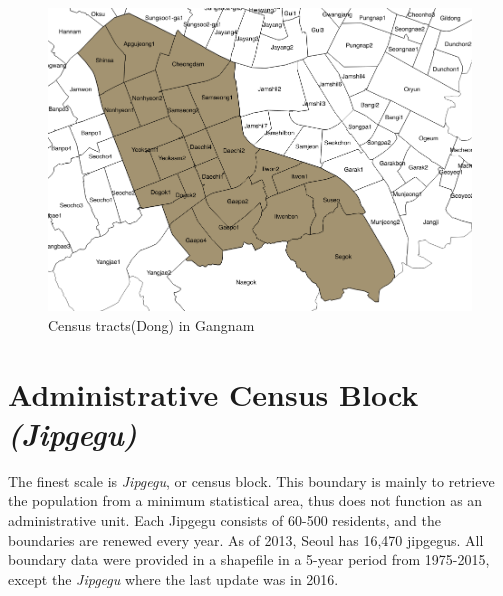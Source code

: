 \documentclass[]{book}
\begin{document}
\begin{figure}

{\centering \includegraphics[width=12.99in]{images/04_dong} 

}

\caption{\label{fig:figs} Census tracts(Dong) in Gangnam}\label{fig:unnamed-chunk-4}
\end{figure}

\section{\texorpdfstring{Administrative Census Block
\emph{(Jipgegu)}}{Administrative Census Block (Jipgegu)}}\label{administrative-census-block-jipgegu}

The finest scale is \emph{Jipgegu}, or census block. This boundary is
mainly to retrieve the population from a minimum statistical area, thus
does not function as an administrative unit. Each Jipgegu consists of
60-500 residents, and the boundaries are renewed every year. As of 2013,
Seoul has 16,470 jipgegus. All boundary data were provided in a
shapefile in a 5-year period from 1975-2015, except the \emph{Jipgegu}
where the last update was in 2016.
\end{document}
